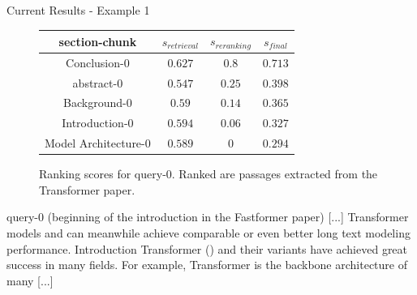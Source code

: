 \begin{frame}{Current Results - Example 1}
    \begin{figure}
        \centering
        \begin{tabular}{|c|c|c|c|}
            \hline 
            section-chunk & $s_{retrieval}$ & $s_{reranking}$ & $s_{final}$ \\
            \hline 
            Conclusion-0 & $0.627$ & $0.8$ & $0.713$ \\
            \hline 
            abstract-0 & $0.547$ & $0.25$ & $0.398$ \\
            \hline 
            Background-0 & $0.59$ & $0.14$ & $0.365$ \\
            \hline 
            Introduction-0 & $0.594$ & $0.06$ & $0.327$ \\
            \hline 
            Model Architecture-0 & $0.589$ & $0$ & $0.294$ \\
            \hline 
        \end{tabular}
        \caption{Ranking scores for query-0. Ranked are passages extracted from the Transformer paper.}
    \end{figure}
    \begin{block}{query-0 (beginning of the introduction in the Fastformer paper)}
        \small
        [...] Transformer models and can meanwhile achieve comparable or even better long text modeling performance. Introduction Transformer () and their variants have achieved great success in many fields. For example, Transformer is the backbone architecture of many [...]
    \end{block}
\end{frame}

